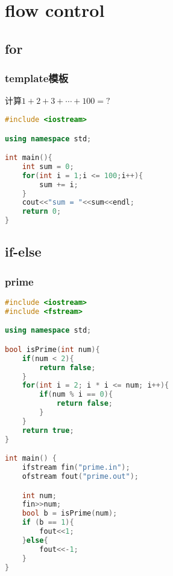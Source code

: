 \documentclass[12pt,twiside,a4paper]{ctexbook}
\numberwithin{chapter}{part}
\begin{document}
\chapter{flow control}
\section{for}
\subsection{template模板}
计算$1+2+3+\cdots+100 = ?$
\begin{lstlisting}[language=C++]
#include <iostream>

using namespace std;

int main(){
	int sum = 0;
	for(int i = 1;i <= 100;i++){
		sum += i;
	}
	cout<<"sum = "<<sum<<endl;
	return 0;
}
\end{lstlisting}

\section{if-else}
\subsection{prime}
\begin{lstlisting}[language=C++]
#include <iostream>
#include <fstream>

using namespace std;

bool isPrime(int num){
	if(num < 2){
		return false;
	}
	for(int i = 2; i * i <= num; i++){
		if(num % i == 0){
			return false;
		}
	}
	return true;
}

int main() {
	ifstream fin("prime.in");
	ofstream fout("prime.out");

	int num;
	fin>>num;
	bool b = isPrime(num);
	if (b == 1){
		fout<<1;
	}else{
		fout<<-1;
	}
}
\end{lstlisting}
\end{document}
